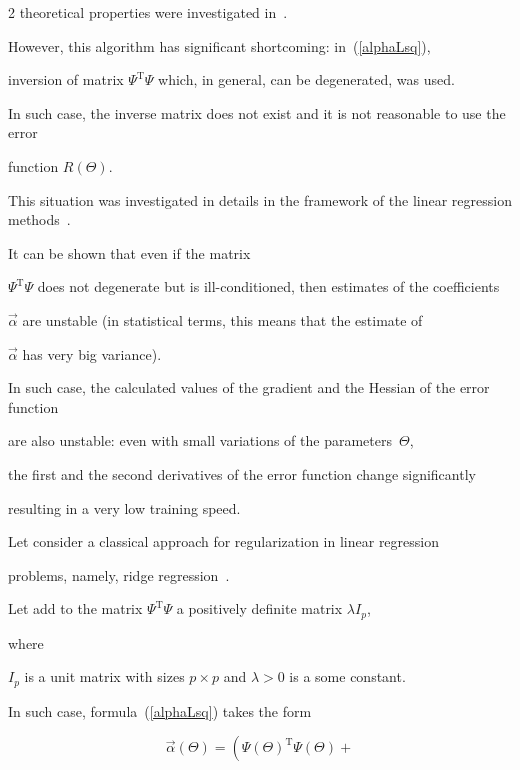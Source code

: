 \begin{multicols}{2}
theoretical properties were investigated in~\cite{ruhe}.



However, this algorithm has significant shortcoming: in~(\ref{alphaLsq}), 

inversion of matrix $\Psi^{\mathrm{T}} \Psi$  which, in general, can be degenerated, was used. 

In such case, the inverse matrix does not exist and it is not reasonable to use the error 

function $R\left( \Theta \right)$.

This situation was investigated in details in the framework of the linear regression methods~\cite{demidenko}.

It can be shown that even if the matrix

$\Psi^{\mathrm{T}} \Psi$ does not degenerate but is ill-conditioned, then estimates of the coefficients

 $\vec \alpha$ are unstable (in statistical terms, this means that the estimate of

 $\vec \alpha$ has very big variance).

In such case, the calculated values of the gradient and the Hessian of the error function 

are also unstable: even with small variations of the parameters~$\Theta$, 

the first and the second derivatives of the error function change significantly 

resulting in a very low training speed.

 

Let consider a classical approach for regularization in linear regression 

problems, namely,  ridge regression~\cite{demidenko}.

Let add to the matrix $\Psi^{\mathrm{T}}\Psi$ a positively definite matrix $\lambda I_p$, 

where

 $I_p$ is a unit matrix with sizes $p\times p$ and $\lambda > 0$ is a some constant.

In such case, formula~(\ref{alphaLsq}) takes the form

\begin{equation}

\label{alphaRidge}

\vec\alpha \left( \Theta \right) =

 \left( \Psi\left( \Theta \right)^{\mathrm{T}} \Psi\left( \Theta \right) + 


\end{equation}
\end{multicols}
